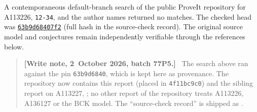 \documentclass[11pt]{article}
\theoremstyle{remark}\newtheorem{remark}[theorem]{Remark}
\newenvironment{writenote}{\begin{quote}\small\raggedright\textbf{[Write note, 2~October 2026, batch 77P5.]}\ }{\end{quote}}
\begin{document}
A contemporaneous default-branch search of the public ProveIt
repository for A113226, \texttt{12-34}, and the author names returned
no matches. The checked head was
\href{https://github.com/VladimirReshetnikov/ProveIt/commit/63b9d68407f21832316eb296fd0885e40e033c90}{\texttt{63b9d68407f2}} (full hash in the source-check record).
The original source model and conjectures remain independently
verifiable through the references below.
\begin{writenote}
The search above ran against the pin \texttt{63b9d6840}, which is kept
here as provenance. The repository now contains this report (placed in
\texttt{4f11bc9c0}) and the sibling report on A113227,
; no other report
of the repository treats A113226, A136127 or the BCK model. The
``source-check record'' is shipped as
.
\end{writenote}
\end{document}

